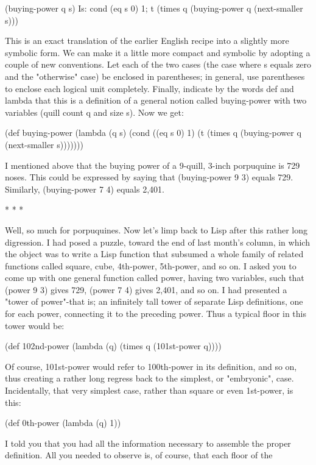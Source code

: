 (buying-power q s) Is:
      cond (eq s 0) 1;
             t (times q (buying-power q (next-smaller s)))

This is an exact translation of the earlier English recipe into a slightly more symbolic
form. We can make it a little more compact and symbolic by adopting a couple of
new conventions. Let each of the two cases (the case where s equals zero and the
"otherwise" case) be enclosed in parentheses; in general, use parentheses to enclose
each logical unit completely. Finally, indicate by the words def and lambda that this is
a definition of a general notion called buying-power with two variables (quill count q
and size s). Now we get:

(def buying-power (lambda (q s)
       (cond ((eq s 0) 1)
              (t (times q (buying-power q (next-smaller s)))))))

I mentioned above that the buying power of a 9-quill, 3-inch porpuquine is 729 noses.
This could be expressed by saying that (buying-power 9 3) equals 729. Similarly,
(buying-power 7 4) equals 2,401.

                                        * * *

       Well, so much for porpuquines. Now let's limp back to Lisp after this rather
long digression. I had posed a puzzle, toward the end of last month's column, in which
the object was to write a Lisp function that subsumed a whole family of related
functions called square, cube, 4th-power, 5th-power, and so on. I asked you to
come up with one general function called power, having two variables, such that
(power 9 3) gives 729, (power 7 4) gives 2,401, and so on. I had presented a "tower
of power"-that is; an infinitely tall tower of separate Lisp definitions, one for each
power, connecting it to the preceding power. Thus a typical floor in this tower would
be:

(def 102nd-power (lambda (q) (times q (101st-power q))))

Of course, 101st-power would refer to 100th-power in its definition, and so on, thus
creating a rather long regress back to the simplest, or "embryonic", case. Incidentally,
that very simplest case, rather than square or even 1st-power, is this:

(def 0th-power (lambda (q) 1))

I told you that you had all the information necessary to assemble the proper definition.
All you needed to observe is, of course, that each floor of the




